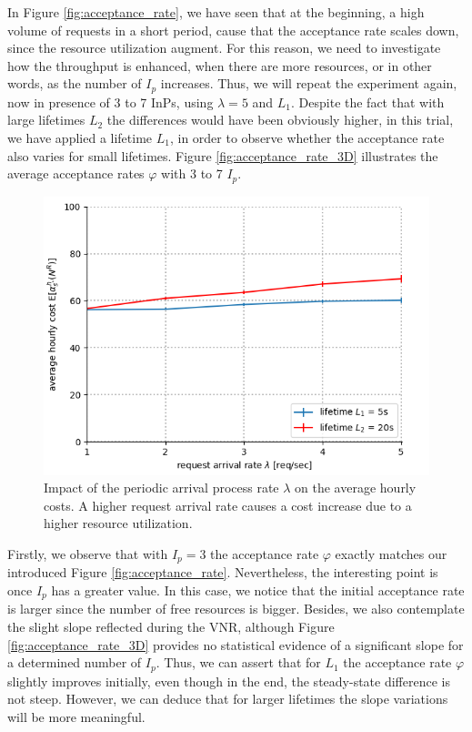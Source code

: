 In Figure \ref{fig:acceptance_rate}, we have seen that at the beginning, a high volume of requests in a short period, cause that the acceptance rate scales down, since the resource utilization augment. For this reason, we need to investigate how the throughput is enhanced, when there are more resources, or in other words, as the number of $I_p$ increases. Thus, we will repeat the experiment again, now in presence of 3 to 7 InPs, using $\lambda = 5$ and $L_1$. Despite the fact that with large lifetimes $L_2$ the differences would have been obviously higher, in this trial, we have applied a lifetime $L_1$, in order to observe whether the acceptance rate also varies for small lifetimes. Figure \ref{fig:acceptance_rate_3D} illustrates the average acceptance rates $\varphi$ with 3 to 7 $I_p$.

\begin{figure}[bth]
	\centering
	\includegraphics[scale=0.68]{gfx/ev_pricing.png}    
  	\caption{Impact of the periodic arrival process rate $\lambda$ on the average hourly costs. A higher request arrival rate causes a cost increase due to a higher resource utilization.} 
  	\label{fig:pricing}
\end{figure}

Firstly, we observe that with $I_p = 3$ the acceptance rate $\varphi$ exactly matches our introduced Figure \ref{fig:acceptance_rate}. Nevertheless, the interesting point is once $I_p$ has a greater value. In this case, we notice that the initial acceptance rate is larger since the number of free resources is bigger. Besides, we also contemplate the slight slope reflected during the VNR, although Figure \ref{fig:acceptance_rate_3D} provides no statistical evidence of a significant slope for a determined number of $I_p$. Thus, we can assert that for $L_1$ the acceptance rate $\varphi$ slightly improves initially, even though in the end, the steady-state difference is not steep. However, we can deduce that for larger lifetimes the slope variations will be more meaningful.

